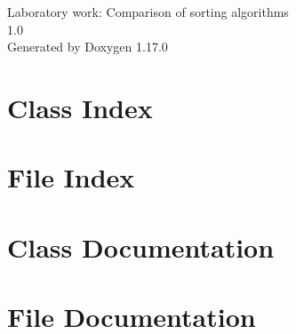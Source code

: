 \documentclass[twoside]{book}
\newcommand{\+}{\discretionary{\mbox{\scriptsize$\hookleftarrow$}}{}{}}
\newcommand{\clearemptydoublepage}{%
  \newpage{\pagestyle{empty}\cleardoublepage}%
}
\begin{document}
  \raggedbottom
    \hypersetup{pageanchor=false,
                bookmarksnumbered=true,
                pdfencoding=unicode
               }
  \begin{titlepage}
  \vspace*{7cm}
  \begin{center}%
  {\Large Laboratory work: Comparison of sorting algorithms}\\
  [1ex]\large 1.0 \\
  \vspace*{1cm}
  {\large Generated by Doxygen 1.17.0}\\
  \end{center}
  \end{titlepage}
  \clearemptydoublepage
  \tableofcontents
  \clearemptydoublepage
  \hypersetup{pageanchor=true}

\chapter{Class Index}

\chapter{File Index}

\chapter{Class Documentation}


\chapter{File Documentation}


  \backmatter
  \newpage
  \clearemptydoublepage
  \printindex
\end{document}
